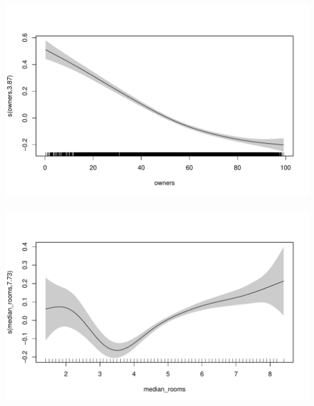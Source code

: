 \documentclass[xetex,mathserif,serif,aspectratio=169]{beamer}
\begin{document}
\begin{frame}[fragile] \frametitle{} \oldB \small

\begin{center}
\includegraphics[width=\textwidth]{img/gamRug06.pdf}
\end{center}

\end{frame}

\begin{frame}[fragile] \frametitle{} \oldB \small

\begin{center}
\includegraphics[width=\textwidth]{img/gamRug07.pdf}
\end{center}

\end{frame}
\end{document}
